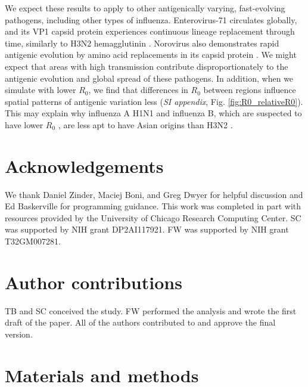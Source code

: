 \documentclass[10pt]{article}
\begin{document}
We expect these results to apply to other antigenically varying, fast-evolving pathogens, including other types of influenza. 
Enterovirus-71 circulates globally, and its VP1 capsid protein experiences continuous lineage replacement through time, similarly to H3N2 hemagglutinin \cite{Tee:2010dia}.
Norovirus also demonstrates rapid antigenic evolution by amino acid replacements in its capsid protein \cite{Lindesmith:2008en}. 
We might expect that areas with high transmission contribute disproportionately to the antigenic evolution and global spread of these pathogens.
In addition, when we simulate with lower $R_0$, we find that differences in $R_0$ between regions influence spatial patterns of antigenic variation less (\textit{SI appendix}, Fig. \ref{fig:R0_relativeR0}).
This may explain why influenza A H1N1 and influenza B, which are suspected to have lower $R_0$ \cite{Bedford:2015fj, Bedford:2014bf}, are less apt to have Asian origins than H3N2 \cite{Bedford:2015fj}.

\section{Acknowledgements}
We thank Daniel Zinder, Maciej Boni, and Greg Dwyer for helpful discussion and Ed Baskerville for programming guidance. 
This work was completed in part with resources provided by the University of Chicago Research Computing Center. 
SC was supported by NIH grant DP2AI117921.
FW was supported by NIH grant T32GM007281.

\section{Author contributions}
TB and SC conceived the study. FW performed the analysis and wrote the first draft of the paper. All of the authors contributed to and approve the final version.

\section{Materials and methods}
\end{document}
